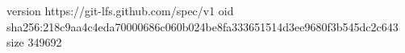 version https://git-lfs.github.com/spec/v1
oid sha256:218c9aa4c4eda70000686c060b024be8fa333651514d3ee9680f3b545dc2c643
size 349692
